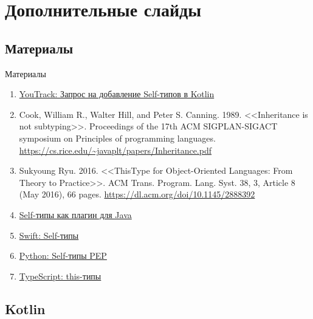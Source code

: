\documentclass[handout,aspectratio=169,usenames,dvipsnames]{beamer}
\begin{document}
    \appendix


    \section{Дополнительные слайды}


    \subsection{Материалы}

    \begin{frame}{Материалы}
        \begin{enumerate}
            \item \href{https://youtrack.jetbrains.com/issue/KT-6494}{\color{blue} YouTrack: Запрос на добавление Self-типов в Kotlin}
            \item Cook, William R., Walter Hill, and Peter S. Canning. 1989. <<Inheritance is not subtyping>>. Proceedings of the 17th ACM SIGPLAN-SIGACT symposium on Principles of programming languages. {\color{blue}\url{https://cs.rice.edu/~javaplt/papers/Inheritance.pdf}}
            \item Sukyoung Ryu. 2016. <<ThisType for Object-Oriented Languages: From Theory to Practice>>. ACM Trans. Program. Lang. Syst. 38, 3, Article 8 (May 2016), 66 pages. {\color{blue}\url{https://dl.acm.org/doi/10.1145/2888392}}
            \item \href{https://github.com/manifold-systems/manifold/blob/master/manifold-deps-parent/manifold-ext/README.md\#the-self-type-with-self}{\color{blue} Self-типы как плагин для Java}
            \item \href{https://docs.swift.org/swift-book/documentation/the-swift-programming-language/types/\#Self-Type}{\color{blue} Swift: Self-типы}
            \item \href{https://peps.python.org/pep-0673/}{\color{blue} Python: Self-типы PEP}
            \item \href{https://www.typescriptlang.org/docs/handbook/2/classes.html\#this-types}{\color{blue}TypeScript: this-типы}
        \end{enumerate}
    \end{frame}


    \subsection{Kotlin}
\end{document}
